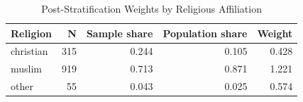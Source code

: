 \begin{table}[!h]
\centering
\caption{Post-Stratification Weights by Religious Affiliation}
\centering
\begin{tabular}[t]{lrrrr}
\toprule
Religion & N & Sample share & Population share & Weight\\
\midrule
christian & 315 & 0.244 & 0.105 & 0.428\\
muslim & 919 & 0.713 & 0.871 & 1.221\\
other & 55 & 0.043 & 0.025 & 0.574\\
\bottomrule
\end{tabular}
\end{table}
